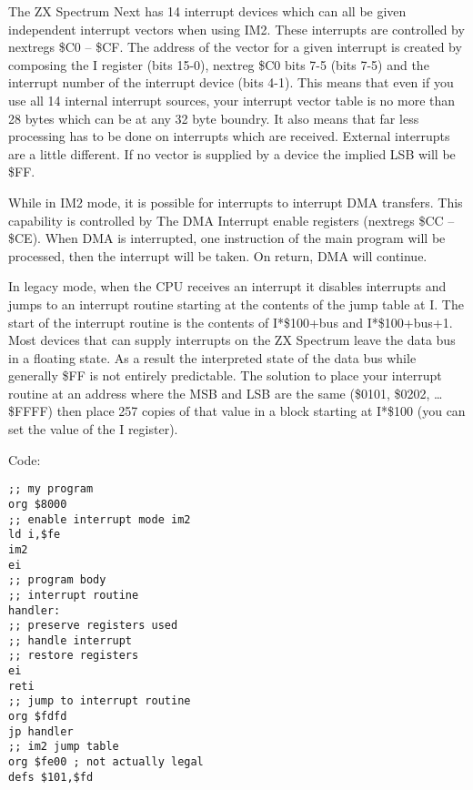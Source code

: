The ZX Spectrum Next has 14 interrupt devices which can all be given
independent interrupt vectors when using IM2. These interrupts are
controlled by nextregs \$C0 -- \$CF.  The address of the vector for a
given interrupt is created by composing the I register (bits 15-0),
nextreg \$C0 bits 7-5 (bits 7-5) and the interrupt number of the
interrupt device (bits 4-1). This means that even if you use all 14
internal interrupt sources, your interrupt vector table is no more
than 28 bytes which can be at any 32 byte boundry. It also means that
far less processing has to be done on interrupts which are
received. External interrupts are a little different. If no vector is
supplied by a device the implied LSB will be \$FF.

While in IM2 mode, it is possible for interrupts to interrupt DMA
transfers. This capability is controlled by The DMA Interrupt enable
registers (nextregs \$CC -- \$CE). When DMA is interrupted, one
instruction of the main program will be processed, then the interrupt
will be taken. On return, DMA will continue.





In legacy mode, when the CPU receives an interrupt it disables
interrupts and jumps to an interrupt routine starting at the contents
of the jump table at I. The start of the interrupt routine is the
contents of I*\$100+bus and I*\$100+bus+1. Most devices that can
supply interrupts on the ZX Spectrum leave the data bus in a floating
state.  As a result the interpreted state of the data bus while
generally \$FF is not entirely predictable.  The solution to place
your interrupt routine at an address where the MSB and LSB are the
same (\$0101, \$0202, … \$FFFF) then place 257 copies of that value in
a block starting at I*\$100 (you can set the value of the I register).

Code:
\begin{verbatim}
;; my program
org $8000
;; enable interrupt mode im2
ld i,$fe
im2
ei
;; program body
;; interrupt routine
handler:
;; preserve registers used
;; handle interrupt
;; restore registers
ei
reti
;; jump to interrupt routine
org $fdfd
jp handler
;; im2 jump table
org $fe00 ; not actually legal
defs $101,$fd
\end{verbatim}


